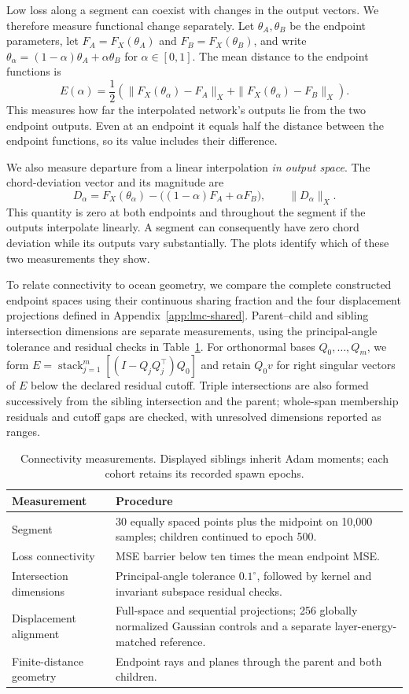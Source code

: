Low loss along a segment can coexist with changes in the output vectors. We therefore measure functional change separately. Let $\theta_A,\theta_B$ be the endpoint parameters, let $F_A=F_X(\theta_A)$ and $F_B=F_X(\theta_B)$, and write $\theta_\alpha=(1-\alpha)\theta_A+\alpha\theta_B$ for $\alpha\in[0,1]$. The mean distance to the endpoint functions is
\[
 E(\alpha)=\frac12\left(
 \|F_X(\theta_\alpha)-F_A\|_X+
 \|F_X(\theta_\alpha)-F_B\|_X\right).
\]
This measures how far the interpolated network's outputs lie from the two endpoint outputs. Even at an endpoint it equals half the distance between the endpoint functions, so its value includes their difference.

We also measure departure from a linear interpolation \emph{in output space}. The chord-deviation vector and its magnitude are
\[
 D_\alpha=F_X(\theta_\alpha)-\bigl((1-\alpha)F_A+\alpha F_B\bigr),
 \qquad \|D_\alpha\|_X.
\]
This quantity is zero at both endpoints and throughout the segment if the outputs interpolate linearly. A segment can consequently have zero chord deviation while its outputs vary substantially. The plots identify which of these two measurements they show.

To relate connectivity to ocean geometry, we compare the complete constructed endpoint spaces using their continuous sharing fraction and the four displacement projections defined in Appendix~\ref{app:lmc-shared}. Parent--child and sibling intersection dimensions are separate measurements, using the principal-angle tolerance and residual checks in Table~\ref{tab:early-method-lmc}. For orthonormal bases $Q_0,\ldots,Q_m$, we form $E=\operatorname{stack}_{j=1}^m[(I-Q_jQ_j^\top)Q_0]$ and retain $Q_0v$ for right singular vectors of $E$ below the declared residual cutoff. Triple intersections are also formed successively from the sibling intersection and the parent; whole-span membership residuals and cutoff gaps are checked, with unresolved dimensions reported as ranges.

\begin{table}[!htbp]\centering
\caption{Connectivity measurements. Displayed siblings inherit Adam moments; each cohort retains its recorded spawn epochs.}\label{tab:early-method-lmc}
\small\begin{tabular}{p{.30\linewidth}p{.62\linewidth}}\toprule
Measurement & Procedure\\\midrule
Segment & 30 equally spaced points plus the midpoint on 10,000 samples; children continued to epoch 500.\\
Loss connectivity & MSE barrier below ten times the mean endpoint MSE.\\
Intersection dimensions & Principal-angle tolerance $0.1^\circ$, followed by kernel and invariant subspace residual checks.\\
Displacement alignment & Full-space and sequential projections; 256 globally normalized Gaussian controls and a separate layer-energy-matched reference.\\
Finite-distance geometry & Endpoint rays and planes through the parent and both children.\\\bottomrule
\end{tabular}
\end{table}
\FloatBarrier

